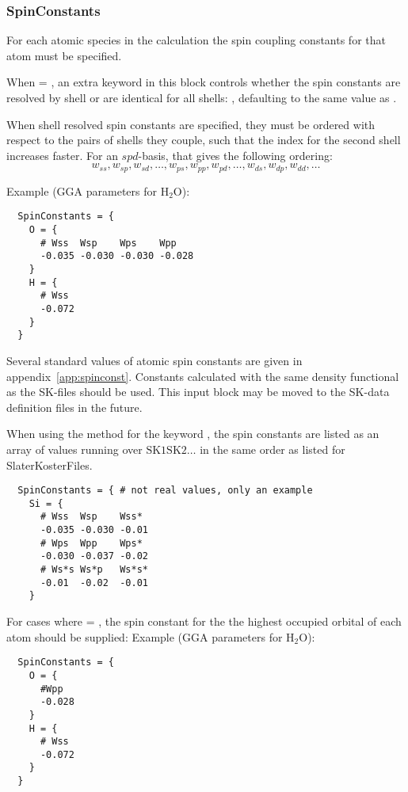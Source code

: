 \subsubsection{SpinConstants}
\label{sec:dftbp.SpinConstants}

For each atomic species in the calculation the spin coupling constants for that
atom must be specified.

When  = , an extra keyword in this block controls
whether the spin constants are resolved by shell or are identical for all
shells: , defaulting to the same value as
.

When shell resolved spin constants are specified, they must be ordered with
respect to the pairs of shells they couple, such that the index for the second
shell increases faster. For an $spd$-basis, that gives the following ordering:
\begin{equation*}
  w_{ss}, w_{sp}, w_{sd}, \dots,
  w_{ps}, w_{pp}, w_{pd}, \dots,
  w_{ds}, w_{dp}, w_{dd}, \dots
\end{equation*}

Example (GGA parameters for H$_2$O):
\begin{verbatim}
  SpinConstants = {
    O = {
      # Wss  Wsp    Wps    Wpp
      -0.035 -0.030 -0.030 -0.028
    }
    H = {
      # Wss
      -0.072
    }
  }
\end{verbatim}

Several standard values of atomic spin constants are given in
appendix~\ref{app:spinconst}. Constants calculated with the same
density functional as the SK-files should be used. This input block
may be moved to the SK-data definition files in the future.

When using the  method for the keyword
, the spin constants are listed as an array of
values running over $\text{SK1}\text{SK2}\ldots$ in the same order as
listed for SlaterKosterFiles.

\begin{verbatim}
  SpinConstants = { # not real values, only an example
    Si = {
      # Wss  Wsp    Wss*
      -0.035 -0.030 -0.01
      # Wps  Wpp    Wps*
      -0.030 -0.037 -0.02
      # Ws*s Ws*p   Ws*s*
      -0.01  -0.02  -0.01
    }
\end{verbatim}

For cases where  = , the spin constant for the the
highest occupied orbital of each atom should be supplied: Example (GGA parameters
for H$_2$O):
\begin{verbatim}
  SpinConstants = {
    O = {
      #Wpp
      -0.028
    }
    H = {
      # Wss
      -0.072
    }
  }
\end{verbatim}

